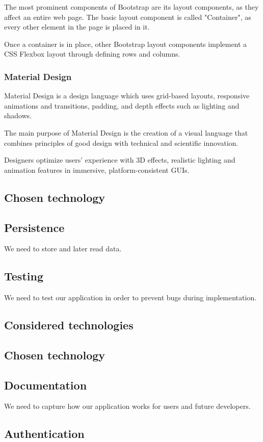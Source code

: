 The most prominent components of Bootstrap are its layout components, as they affect an entire web page. The basic layout component is called "Container", as every other element in the page is placed in it.

Once a container is in place, other Bootstrap layout components implement a CSS Flexbox layout through defining rows and columns.

\subsubsection*{Material Design}
Material Design is a design language which uses grid-based layouts, responsive animations and transitions, padding, and depth effects such as lighting and shadows.

The main purpose of Material Design is the creation of a visual language that combines principles of good design with technical and scientific innovation. 

Designers optimize users' experience with 3D effects, realistic lighting and animation features in immersive, platform-consistent GUIs.

\subsection*{Chosen technology}



\subsection{Persistence}
We need to store and later read data.


\subsection{Testing}
We need to test our application in order to prevent bugs during implementation.
\subsection*{Considered technologies}

\subsubsection*{}

\subsubsection*{}

\subsection*{Chosen technology}

\subsection{Documentation}
We need to capture how our application works for users and future developers.


\subsection{Authentication}

